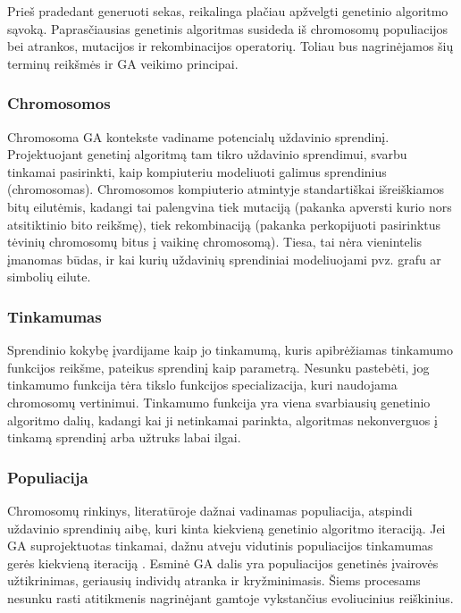 \documentclass{VUMIFInfKursinis}
\begin{document}
Prieš pradedant generuoti sekas, reikalinga plačiau apžvelgti genetinio algoritmo sąvoką.
Paprasčiausias genetinis algoritmas susideda iš chromosomų populiacijos bei atrankos, mutacijos ir rekombinacijos operatorių.
Toliau bus nagrinėjamos šių terminų reikšmės ir GA veikimo principai.

\subsubsection{Chromosomos}

Chromosoma GA kontekste vadiname potencialų uždavinio sprendinį.
Projektuojant genetinį algoritmą tam tikro uždavinio sprendimui, svarbu tinkamai pasirinkti,
kaip kompiuteriu modeliuoti galimus sprendinius (chromosomas).
Chromosomos kompiuterio atmintyje standartiškai išreiškiamos bitų eilutėmis,
kadangi tai palengvina tiek mutaciją (pakanka apversti kurio nors atsitiktinio bito reikšmę),
tiek rekombinaciją (pakanka perkopijuoti pasirinktus tėvinių chromosomų bitus į vaikinę chromosomą).
Tiesa, tai nėra vienintelis įmanomas būdas, ir kai kurių uždavinių sprendiniai modeliuojami pvz. grafu ar simbolių eilute.

\subsubsection{Tinkamumas}

Sprendinio kokybę įvardijame kaip jo tinkamumą, kuris apibrėžiamas tinkamumo funkcijos reikšme, pateikus sprendinį kaip parametrą.
Nesunku pastebėti, jog tinkamumo funkcija tėra tikslo funkcijos specializacija, kuri naudojama chromosomų vertinimui.
Tinkamumo funkcija yra viena svarbiausių genetinio algoritmo dalių,
kadangi kai ji netinkamai parinkta, algoritmas nekonverguos į tinkamą sprendinį arba užtruks labai ilgai.

\subsubsection{Populiacija}

Chromosomų rinkinys, literatūroje dažnai vadinamas populiacija, atspindi uždavinio sprendinių aibę, kuri kinta kiekvieną genetinio algoritmo iteraciją.
Jei GA suprojektuotas tinkamai, dažnu atveju vidutinis populiacijos tinkamumas gerės kiekvieną iteraciją \cite{simpson1999faster}.
Esminė GA dalis yra populiacijos genetinės įvairovės užtikrinimas, geriausių individų atranka ir kryžminimasis.
Šiems procesams nesunku rasti atitikmenis nagrinėjant gamtoje vykstančius evoliucinius reiškinius.
\end{document}
